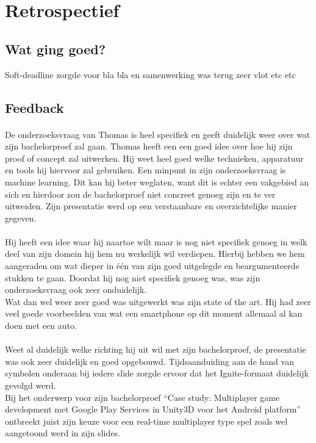\documentclass[fleqn,10pt]{voorstel}
\begin{document}
\section{Retrospectief}
\subsection{Wat ging goed?}
Soft-deadline zorgde voor bla bla en samenwerking was terug zeer vlot etc etc

\subsection{Feedback}

\paragraph{\cite{VanSevenant2016}}
De onderzoeksvraag van Thomas is heel specifiek en geeft duidelijk weer over wat zijn bachelorproef zal gaan. Thomas heeft een een goed idee over hoe hij zijn proof of concept zal uitwerken. Hij weet heel goed welke technieken, apparatuur en tools hij hiervoor zal gebruiken. Een minpunt in zijn onderzoeksvraag is machine learning. Dit kan hij beter weglaten, want dit is echter een vakgebied an sich en hierdoor zou de bachelorproef niet concreet genoeg zijn en te ver uitweiden. Zijn presentatie werd op een verstaanbare en overzichtelijke manier gegeven.

\paragraph{\cite{Willems2016}}
Hij heeft een idee waar hij naartoe wilt maar is nog niet specifiek genoeg in welk deel van zijn domein hij hem nu werkelijk wil verdiepen. Hierbij hebben we hem aangeraden om wat dieper in één van zijn goed uitgelegde en beargumenteerde stukken te gaan. Doordat hij nog niet specifiek genoeg was, was zijn onderzoeksvraag ook zeer onduidelijk.\\
Wat dan wel weer zeer goed was uitgewerkt was zijn state of the art. Hij had zeer veel goede voorbeelden van wat een smartphone op dit moment allemaal al kan doen met een auto.

\paragraph{\cite{Pinsard2016}}
Weet al duidelijk welke richting hij uit wil met zijn bachelorproef, de presentatie was ook zeer duidelijk en goed opgebouwd. Tijdsaanduiding aan de hand van symbolen onderaan bij iedere slide zorgde ervoor dat het Ignite-formaat duidelijk gevolgd werd.\\
Bij het onderwerp voor zijn bachelorproef “Case study: Multiplayer game development met Google Play Services in Unity3D voor het Android platform” ontbreekt juist zijn keuze voor een real-time multiplayer type spel zoals wel aangetoond werd in zijn slides.
\end{document}
